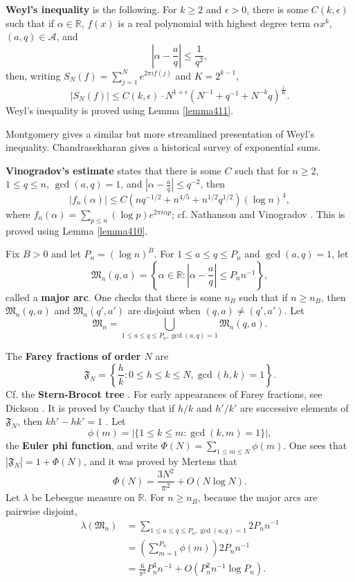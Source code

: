 \documentclass{amsart}
\begin{document}
\textbf{Weyl's inequality} \cite[p.~114, Theorem 4.3]{nathanson} is the following.
For $k \geq 2$ and $\epsilon>0$, there is some $C(k,\epsilon)$ such that if
$\alpha \in \mathbb{R}$, $f(x)$ is a real polynomial with highest degree term $\alpha x^k$, 
$(a,q) \in \mathscr{A}$, and
\[
\left|\alpha-\frac{a}{q}\right| \leq \frac{1}{q^2},
\]
then, writing $S_N(f)=\sum_{j=1}^N e^{2\pi i f(j)}$ and $K=2^{k-1}$,
\[
|S_N(f)| \leq C(k,\epsilon) \cdot N^{1+\epsilon}(N^{-1}+q^{-1}+N^{-k}q)^{\frac{1}{K}}.
\]
Weyl's inequality is proved using Lemma \ref{lemma411}.

Montgomery \cite[Chapter 3]{montgomery} gives a similar but more streamlined presentation of Weyl's inequality.
Chandrasekharan \cite{MR0369277} gives a historical survey of exponential sums.

\textbf{Vinogradov's estimate}  \cite[p.~26, Theorem 3.1]{vaughan}  states that
there is some $C$ such that for $n \geq 2$, $1 \leq q \leq n$, $\gcd(a,q)=1$, and $\left|\alpha - \frac{a}{q}\right| \leq q^{-2}$, then
\begin{equation}
|f_n(\alpha)| \leq C (nq^{-1/2} + n^{4/5} + n^{1/2} q^{1/2}) (\log n)^4,
\label{vinogradov}
\end{equation}
where  $f_n(\alpha) = \sum_{p \leq n} (\log p)e^{2\pi i\alpha p}$;
cf. Nathanson \cite[p.~220, Theorem 8.5]{nathanson} and Vinogradov \cite[p.~131, Chapter IX, Theorem 1]{vinogradov}.
This is proved using Lemma \ref{lemma410}.


Fix $B>0$ and let $P_n = (\log n)^B$. For $1 \leq a \leq q \leq P_n$ and $\gcd(a,q)=1$, let
\[
\mathfrak{M}_n(q,a) = \left\{ \alpha \in \mathbb{R} : \left|\alpha - \frac{a}{q} \right| \leq P_n n^{-1} \right\},
\]
called a \textbf{major arc}. One checks that there is some $n_B$ such that if $n \geq n_B$, then
$\mathfrak{M}_n(q,a)$ and $\mathfrak{M}_n(q',a')$ are disjoint when $(q,a) \neq (q',a')$. 
Let
\[
\mathfrak{M}_n = \bigcup_{1 \leq a \leq q \leq P_n, \gcd(a,q)=1} \mathfrak{M}_n(q,a).
\]

The \textbf{Farey fractions of order $N$} are
\[
\mathfrak{F}_N = \left\{ \frac{h}{k} : 0 \leq h \leq k \leq N, \gcd(h,k)=1\right\}.
\]
Cf. the \textbf{Stern-Brocot tree} \cite[\S 4.5]{concrete}.
For early appearances of  Farey
fractions, see Dickson \cite[pp.~155--158, Chapter V]{dicksonI}.
It is proved by Cauchy that if $h/k$ and $h'/k'$ are successive elements of $\mathfrak{F}_N$, then
$kh'-hk'=1$ \cite[p.~23, Theorem 28]{wright}.
Let
\[
\phi(m) = |\{1 \leq k \leq m: \gcd(k,m)=1\}|,
\]
the \textbf{Euler phi function}, and write $\Phi(N) = \sum_{1 \leq m \leq N} \phi(m)$. 
One sees that 
$|\mathfrak{F}_N| = 1+\Phi(N)$, and
 it was proved by Mertens  \cite[p.~268]{wright} that
\[
\Phi(N) = \frac{3N^2}{\pi^2} + O(N\log N).
\]
Let $\lambda$ be Lebesgue measure on $\mathbb{R}$.
For $n \geq n_B$, because the major arcs are pairwise disjoint,
\begin{align*}
\lambda(\mathfrak{M}_n)&=\sum_{1 \leq a \leq q \leq P_n, \gcd(a,q)=1} 2P_n n^{-1}\\
&=\left( \sum_{m=1}^{P_n} \phi(m) \right) 2P_n n^{-1}\\
&=\frac{6}{\pi^2} P_n^3 n^{-1} + O(P_n^2 n^{-1} \log P_n).
\end{align*} 
\end{document}
